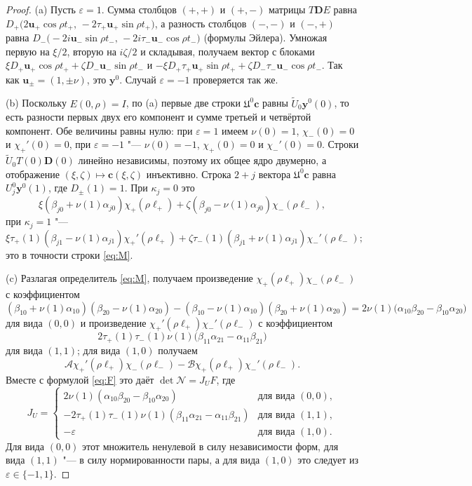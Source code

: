 \documentclass[12pt,a4paper]{article}
\numberwithin{equation}{section}
\theoremstyle{definition}
\newcommand{\Uf}{\mathfrak U}
\newcommand{\Mm}{\mathcal N}
\newcommand{\Dd}{\mathbf D}
\begin{document}
\begin{proof}
(a) Пусть $\varepsilon=1$. Сумма столбцов $(+,+)$ и $(+,-)$ матрицы $T\Dd E$ равна
$D_+\bigl(2\mathbf u_+\cos\rho t_+,\,-2\tau_+\mathbf u_+\sin\rho t_+\bigr)$, а разность столбцов
$(-,-)$ и $(-,+)$ равна $D_-\bigl(-2i\mathbf u_-\sin\rho t_-,\,-2i\tau_-\mathbf u_-\cos\rho t_-\bigr)$
(формулы Эйлера). Умножая первую на $\xi/2$, вторую на $i\zeta/2$ и складывая,
получаем вектор с блоками $\xi D_+\mathbf u_+\cos\rho t_++\zeta D_-\mathbf u_-\sin\rho t_-$
и $-\xi D_+\tau_+\mathbf u_+\sin\rho t_++\zeta D_-\tau_-\mathbf u_-\cos\rho t_-$. Так
как $\mathbf u_\pm=(1,\pm\nu)$, это $\mathbf y^0$. Случай $\varepsilon=-1$ проверяется так же.

(b) Поскольку $E(0,\rho)=I$, по (a) первые две строки $\Uf^0\mathbf c$ равны
$\widetilde U_0\mathbf y^0(0)$, то есть разности первых двух его компонент и сумме третьей и
четвёртой компонент. Обе величины равны нулю: при $\varepsilon=1$ имеем $\nu(0)=1$, $\chi_-(0)=0$
и $\chi_+'(0)=0$, при $\varepsilon=-1$ "--- $\nu(0)=-1$, $\chi_+(0)=0$ и $\chi_-'(0)=0$. Строки $\widetilde U_0T(0)\Dd(0)$ линейно независимы, поэтому их общее ядро
двумерно, а отображение $(\xi,\zeta)\mapsto\mathbf c(\xi,\zeta)$ инъективно. Строка $2+j$ вектора
$\Uf^0\mathbf c$ равна $U_j^0\mathbf y^0(1)$, где $D_\pm(1)=1$. При $\kappa_j=0$ это
\[
 \xi(\beta_{j0}+\nu(1)\alpha_{j0})\chi_+(\rho\ell_+)
 +\zeta(\beta_{j0}-\nu(1)\alpha_{j0})\chi_-(\rho\ell_-),
\]
при $\kappa_j=1$ "---
\[
 \xi\tau_+(1)(\beta_{j1}-\nu(1)\alpha_{j1})\chi_+'(\rho\ell_+)
 +\zeta\tau_-(1)(\beta_{j1}+\nu(1)\alpha_{j1})\chi_-'(\rho\ell_-);
\]
это в точности строки \eqref{eq:M}.

(c) Разлагая определитель \eqref{eq:M}, получаем произведение
$\chi_+(\rho\ell_+)\chi_-(\rho\ell_-)$ с коэффициентом
\[
 (\beta_{10}+\nu(1)\alpha_{10})(\beta_{20}-\nu(1)\alpha_{20})
 -(\beta_{10}-\nu(1)\alpha_{10})(\beta_{20}+\nu(1)\alpha_{20})
 =2\nu(1)\bigl(\alpha_{10}\beta_{20}-\beta_{10}\alpha_{20}\bigr)
\]
для вида $(0,0)$ и произведение $\chi_+'(\rho\ell_+)\chi_-'(\rho\ell_-)$ с коэффициентом
\[
 2\tau_+(1)\tau_-(1)\nu(1)\bigl(\beta_{11}\alpha_{21}-\alpha_{11}\beta_{21}\bigr)
\]
для вида $(1,1)$; для вида $(1,0)$ получаем
\[
 \mathcal A\chi_+'(\rho\ell_+)\chi_-(\rho\ell_-)
 -\mathcal B\chi_+(\rho\ell_+)\chi_-'(\rho\ell_-).
\]
Вместе с формулой \eqref{eq:F} это даёт $\det\Mm=J_UF$, где
\[
 J_U=\begin{cases}
 2\nu(1)(\alpha_{10}\beta_{20}-\beta_{10}\alpha_{20}) & \text{для вида }(0,0),\\
 -2\tau_+(1)\tau_-(1)\nu(1)(\beta_{11}\alpha_{21}-\alpha_{11}\beta_{21}) & \text{для вида }(1,1),\\
 -\varepsilon & \text{для вида }(1,0).
 \end{cases}
\]
Для вида $(0,0)$ этот множитель ненулевой в силу независимости форм,
для вида $(1,1)$ "--- в силу нормированности пары, а для вида $(1,0)$
это следует из $\varepsilon\in\{-1,1\}$.


\end{proof}
\end{document}
